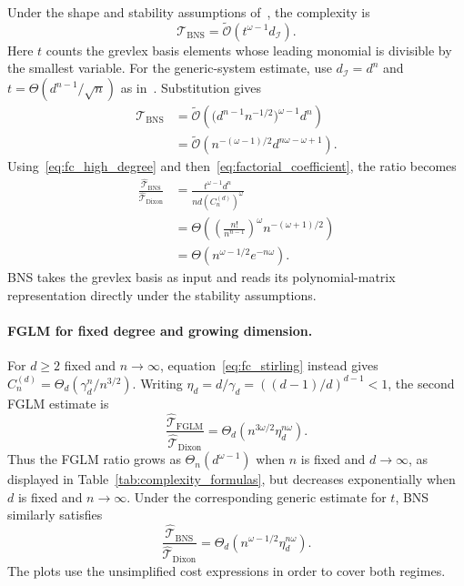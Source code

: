 Under the shape and stability assumptions of~\cite[Theorem~1.1]{BerthomieuNeigerSafey2022}, the complexity is
\[
\mathcal T_{\mathrm{BNS}}
=\widetilde{\mathcal O}\!\left(t^{\omega-1}d_{\mathcal I}\right).
\]
Here $t$ counts the grevlex basis elements whose leading monomial is divisible by the smallest variable. For the generic-system estimate, use $d_{\mathcal I}=d^n$ and $t=\Theta(d^{n-1}/\sqrt n)$ as in~\cite[Section~6.2 and Table~1]{BerthomieuNeigerSafey2022}. Substitution gives
\begin{align*}
\mathcal T_{\mathrm{BNS}}
&=\widetilde{\mathcal O}\!\left(
\bigl(d^{n-1}n^{-1/2}\bigr)^{\omega-1}d^n\right)\\
&=\widetilde{\mathcal O}\!\left(n^{-(\omega-1)/2}d^{n\omega-\omega+1}\right).
\end{align*}
Using~\eqref{eq:fc_high_degree} and then~\eqref{eq:factorial_coefficient}, the ratio becomes
\begin{align*}
\frac{\widehat{\mathcal T}_{\mathrm{BNS}}}{\widehat{\mathcal T}_{\mathrm{Dixon}}}
&=\frac{t^{\omega-1}d^n}{nd\left(C_n^{(d)}\right)^\omega}\\
&=\Theta\!\left(
\left(\frac{n!}{n^{n-1}}\right)^\omega n^{-(\omega+1)/2}\right)\\
&=\Theta\!\left(n^{\omega-1/2}e^{-n\omega}\right).
\end{align*}
BNS takes the grevlex basis as input and reads its polynomial-matrix representation directly under the stability assumptions.

\paragraph{FGLM for fixed degree and growing dimension.}
For $d\ge2$ fixed and $n\to\infty$, equation~\eqref{eq:fc_stirling} instead gives $C_n^{(d)}=\Theta_d(\gamma_d^n/n^{3/2})$. Writing $\eta_d=d/\gamma_d=((d-1)/d)^{d-1}<1$, the second FGLM estimate is
\[
\frac{\widehat{\mathcal T}_{\mathrm{FGLM}}}{\widehat{\mathcal T}_{\mathrm{Dixon}}}
=\Theta_d\!\left(n^{3\omega/2}\eta_d^{n\omega}\right).
\]
Thus the FGLM ratio grows as $\Theta_n(d^{\omega-1})$ when $n$ is fixed and $d\to\infty$, as displayed in Table~\ref{tab:complexity_formulas}, but decreases exponentially when $d$ is fixed and $n\to\infty$. Under the corresponding generic estimate for $t$, BNS similarly satisfies
\[
\frac{\widehat{\mathcal T}_{\mathrm{BNS}}}{\widehat{\mathcal T}_{\mathrm{Dixon}}}
=\Theta_d\!\left(n^{\omega-1/2}\eta_d^{n\omega}\right).
\]
The plots use the unsimplified cost expressions in order to cover both regimes.

